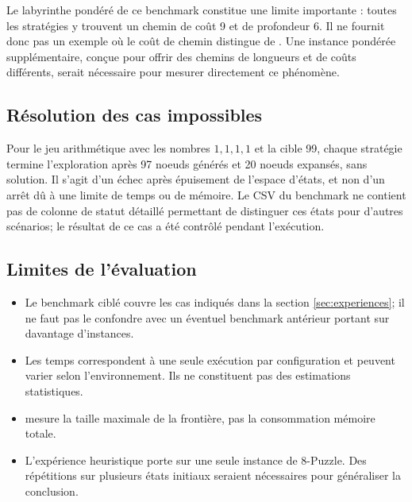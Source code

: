 Le labyrinthe pondéré de ce benchmark constitue une limite importante : toutes
les stratégies y trouvent un chemin de coût 9 et de profondeur 6. Il ne
fournit donc pas un exemple où le coût de chemin distingue \BFS{} de \UCS{}.
Une instance pondérée supplémentaire, conçue pour offrir des chemins de
longueurs et de coûts différents, serait nécessaire pour mesurer directement
ce phénomène.

\subsection{Résolution des cas impossibles}

Pour le jeu arithmétique avec les nombres $1,1,1,1$ et la cible 99, chaque
stratégie termine l'exploration après 97 noeuds générés et 20 noeuds expansés,
sans solution. Il s'agit d'un échec après épuisement de l'espace d'états, et
non d'un arrêt dû à une limite de temps ou de mémoire. Le CSV du benchmark ne
contient pas de colonne de statut détaillé permettant de distinguer ces états
pour d'autres scénarios; le résultat de ce cas a été contrôlé pendant
l'exécution.

\subsection{Limites de l'évaluation}

\begin{itemize}
    \item Le benchmark ciblé couvre les cas indiqués dans la section
    \cref{sec:experiences}; il ne faut pas le confondre avec un éventuel
    benchmark antérieur portant sur davantage d'instances.
    \item Les temps correspondent à une seule exécution par configuration et
    peuvent varier selon l'environnement. Ils ne constituent pas des
    estimations statistiques.
    \item {} mesure la taille maximale de la frontière, pas la
    consommation mémoire totale.
    \item L'expérience heuristique porte sur une seule instance de 8-Puzzle.
    Des répétitions sur plusieurs états initiaux seraient nécessaires pour
    généraliser la conclusion.
\end{itemize}
